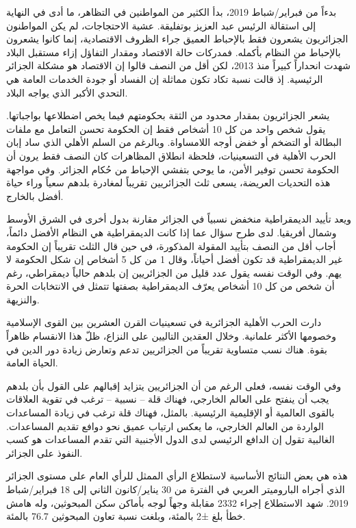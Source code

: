 \documentclass{article}
\begin{document}
 بدءاً من فبراير/شباط 2019، بدأ الكثير من المواطنين في التظاهر، ما أدى في النهاية إلى استقالة الرئيس عبد العزيز بوتفليقة. عشية الاحتجاجات، لم يكن المواطنون الجزائريون يشعرون فقط بالإحباط العميق جراء الظروف الاقتصادية، إنما كانوا يشعرون بالإحباط من النظام بأكمله. فمدركات حالة الاقتصاد ومقدار التفاؤل إزاء مستقبل البلاد شهدت انحداراً كبيراً منذ 2013، لكن أقل من النصف قالوا إن الاقتصاد هو مشكلة الجزائر الرئيسية. إذ قالت نسبة تكاد تكون مماثلة إن الفساد أو جودة الخدمات العامة هي التحدي الأكبر الذي يواجه البلاد. 
	
 يشعر الجزائريون بمقدار محدود من الثقة بحكومتهم فيما يخص اضطلاعها بواجباتها. يقول شخص واحد من كل 10 أشخاص فقط إن الحكومة تحسن التعامل مع ملفات البطالة أو التضخم أو خفض أوجه اللامساواة. وبالرغم من السلم الأهلي الذي ساد إبان الحرب الأهلية في التسعينيات، فلحظة انطلاق المظاهرات كان النصف فقط يرون أن الحكومة تحسن توفير الأمن، ما يوحي بتفشي الإحباط من حُكام الجزائر. وفي مواجهة هذه التحديات العريضة، يسعى ثلث الجزائريين تقريباً لمغادرة بلدهم سعياً وراء حياة أفضل بالخارج.
	
	
 ويعد تأييد الديمقراطية منخفض نسبياً في الجزائر مقارنة بدول أخرى في الشرق الأوسط وشمال أفريقيا. لدى طرح سؤال عما إذا كانت الديمقراطية هي النظام الأفضل دائماً، أجاب أقل من النصف بتأييد المقولة المذكورة، في حين قال الثلث تقريباً إن الحكومة غير الديمقراطية قد تكون أفضل أحياناً، وقال 1 من كل 5 أشخاص إن شكل الحكومة لا يهم. وفي الوقت نفسه يقول عدد قليل من الجزائريين إن بلدهم حالياً ديمقراطي، رغم أن شخص من كل 10 أشخاص يعرّف الديمقراطية بصفتها تتمثل في الانتخابات الحرة والنزيهة.
	
 دارت الحرب الأهلية الجزائرية في تسعينيات القرن العشرين بين القوى الإسلامية وخصومها الأكثر علمانية. وخلال العقدين التاليين على النزاع، ظلّ هذا الانقسام ظاهراً بقوة. هناك نسب متساوية تقريباً من الجزائريين تدعم وتعارض زيادة دور الدين في الحياة العامة.
	
 وفي الوقت نفسه، فعلى الرغم من أن الجزائريين يتزايد إقبالهم على القول بأن بلدهم يجب أن ينفتح على العالم الخارجي، فهناك قلة – نسبية – ترغب في تقوية العلاقات بالقوى العالمية أو الإقليمية الرئيسية. بالمثل، فهناك قلة ترغب في زيادة المساعدات الواردة من العالم الخارجي، ما يعكس ارتياب عميق نحو دوافع تقديم المساعدات. الغالبية تقول إن الدافع الرئيسي لدى الدول الأجنبية التي تقدم المساعدات هو كسب النفوذ على الجزائر.
	
 هذه هي بعض النتائج الأساسية لاستطلاع الرأي الممثل للرأي العام على مستوى الجزائر الذي أجراه الباروميتر العربي   في الفترة من 30 يناير/كانون الثاني إلى 18 فبراير/شباط 2019. شهد الاستطلاع إجراء 2332 مقابلة وجهاً لوجه بأماكن سكن المبحوثين، وله هامش خطأ بلغ ±2 بالمئة، وبلغت نسبة تعاون المبحوثين 76.7 بالمئة.
	\pagebreak
\end{document}

